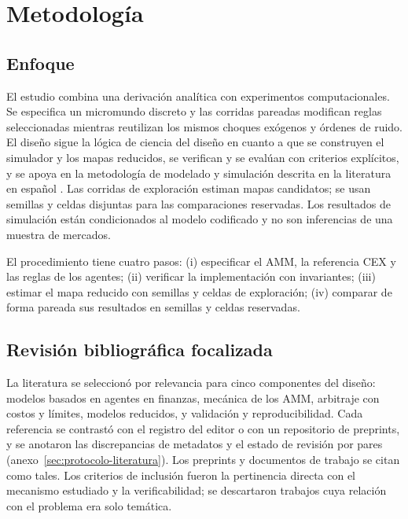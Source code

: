 \chapter{Metodología}
\label{cap:metodologia}

\section{Enfoque}

El estudio combina una derivación analítica con experimentos computacionales. Se especifica un micromundo discreto y las corridas pareadas modifican reglas seleccionadas mientras reutilizan los mismos choques exógenos y órdenes de ruido. El diseño sigue la lógica de ciencia del diseño \cite{hevner2004design} en cuanto a que se construyen el simulador y los mapas reducidos, se verifican y se evalúan con criterios explícitos, y se apoya en la metodología de modelado y simulación descrita en la literatura en español \cite{hernandez2014metodologia}. Las corridas de exploración estiman mapas candidatos; se usan semillas y celdas disjuntas para las comparaciones reservadas. Los resultados de simulación están condicionados al modelo codificado y no son inferencias de una muestra de mercados.

El procedimiento tiene cuatro pasos: (i) especificar el AMM, la referencia CEX y las reglas de los agentes; (ii) verificar la implementación con invariantes; (iii) estimar el mapa reducido con semillas y celdas de exploración; (iv) comparar de forma pareada sus resultados en semillas y celdas reservadas.

\section{Revisión bibliográfica focalizada}

La literatura se seleccionó por relevancia para cinco componentes del diseño: modelos basados en agentes en finanzas, mecánica de los AMM, arbitraje con costos y límites, modelos reducidos, y validación y reproducibilidad. Cada referencia se contrastó con el registro del editor o con un repositorio de preprints, y se anotaron las discrepancias de metadatos y el estado de revisión por pares (anexo~\ref{sec:protocolo-literatura}). Los preprints y documentos de trabajo se citan como tales. Los criterios de inclusión fueron la pertinencia directa con el mecanismo estudiado y la verificabilidad; se descartaron trabajos cuya relación con el problema era solo temática.

